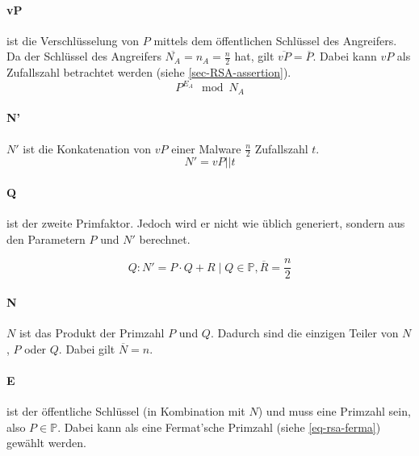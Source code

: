             \paragraph{vP} ist die Verschlüsselung von $P$ mittels dem öffentlichen Schlüssel des Angreifers. Da der Schlüssel des Angreifers $\overline{N_{A}} = n_{A} = \frac{n}{2}$ hat, gilt $\overline{vP} = \overline{P}$. Dabei kann $vP$ als Zufallszahl betrachtet werden (siehe \ref{sec-RSA-assertion}). 
                \begin{equation}
                    P^{E_{A}} \mod N_{A}
                \end{equation}                
            
            \paragraph{N'} $N'$ ist die Konkatenation von $vP$ einer Malware $\frac{n}{2}$ Zufallszahl $t$.
            \begin{equation}
                N' = vP || t
            \end{equation}

            \paragraph{Q} ist der zweite Primfaktor. Jedoch wird er nicht wie üblich generiert, sondern aus den Parametern $P$ und $N'$ berechnet.
            
            \begin{equation}
                Q : N' = P \cdot Q + R \mid Q \in \mathbb{P}, \overline{R} = \frac{n}{2}
            \end{equation}

            \paragraph{N} $N$ ist das Produkt der Primzahl $P$ und $Q$. Dadurch sind die einzigen Teiler von $N$, $P$ oder $Q$. Dabei gilt $\overline{N} = n$.

            \paragraph{E} ist der öffentliche Schlüssel (in Kombination mit $N$) und muss eine Primzahl sein, also $P \in \mathbb{P}$. Dabei kann als eine Fermat'sche Primzahl (siehe \ref{eq-rsa-ferma}) gewählt werden.

